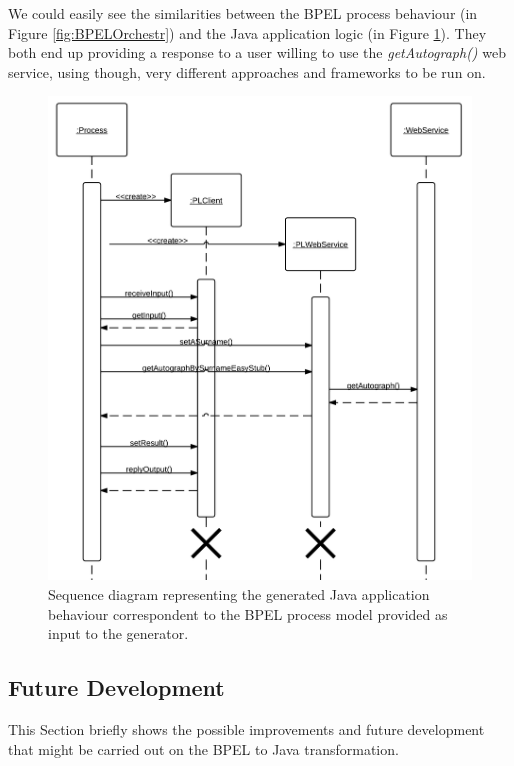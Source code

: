 We could easily see the similarities between the BPEL process behaviour (in Figure \ref{fig:BPELOrchestr}) and the Java application logic (in Figure \ref{fig:GeneratorSequenceDiagram}). They both end up providing a response to a user willing to use the \textit{getAutograph()} web service, using though, very different approaches and frameworks to be run on.


\begin{figure}
  \begin{center}
    \includegraphics[scale=1]{pictures/GeneratorSequenceDiagram.png}
    \caption{Sequence diagram representing the generated Java application behaviour correspondent to the BPEL process model provided as input to the generator.}
    \label{fig:GeneratorSequenceDiagram}
  \end{center}
\end{figure}


\subsection{Future Development}
\label{sec:FutureDevelopment}
This Section briefly shows the possible improvements and future development that might be carried out on the BPEL to Java transformation.

